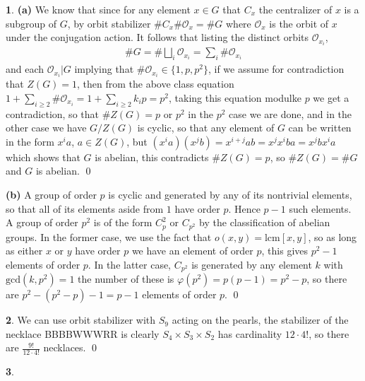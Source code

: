 \documentclass[10.5pt]{article}
\theoremstyle{definition}
\newtheorem{pb}{}
\newcommand{\set}[1]{\{#1\}}
\begin{document}
    \begin{pb}
        \textbf{(a)} We know that since for any element \(x \in G\) that \(C_x\) the centralizer of \(x\) is a subgroup of \(G\), by orbit stabilizer \(\#C_x\#\mathcal{O}_x = \#G\) where \(\mathcal{O}_x\) is the orbit of \(x\) under the conjugation action. It follows that listing the distinct orbits \(\mathcal{O}_{x_i}\),
        \begin{align*}
            \#G = \#\bigsqcup_i \mathcal{O}_{x_i} = \sum_i \#\mathcal{O}_{x_i}
        \end{align*}
        and each \(\mathcal{O}_{x_i} \vert G\) implying that \(\#\mathcal{O}_{x_i} \in \set{1,p,p^2}\), if we assume for contradiction that \(Z(G) = 1\), then from the above class equation \(1 + \sum_{i \geq 2} \#\mathcal{O}_{x_i} = 1 + \sum_{i \geq 2}k_i p = p^2\), taking this equation modulke \(p\) we get a contradiction, so that \(\#Z(G) = p\) or \(p^2\) in the \(p^2\) case we are done, and in the other case we have \(G/Z(G)\) is cyclic, so that any element of \(G\) can be written in the form \(x^ia\), \(a \in Z(G)\), but \((x^ia)(x^jb) = x^{i+j}ab = x^jx^iba = x^jbx^ia\) which shows that \(G\) is abelian, this contradicts \(\#Z(G) = p\), so \(\#Z(G) = \#G\) and \(G\) is abelian. \qed

        \textbf{(b)} A group of order \(p\) is cyclic and generated by any of its nontrivial elements, so that all of its elements aside from \(1\) have order \(p\). Hence \(p-1\) such elements. A group of order \(p^2\) is of the form \(C_p^2\) or \(C_{p^2}\) by the classification of abelian groups. In the former case, we use the fact that \(o(x,y) = \text{lcm}[x,y]\), so as long as either \(x\) or \(y\) have order \(p\) we have an element of order \(p\), this gives \(p^2 - 1\) elements of order \(p\). In the latter case, \(C_{p^2}\) is generated by any element \(k\) with \(\text{gcd}(k,p^2) = 1\) the number of these is \(\varphi(p^2) = p(p-1) = p^2 - p\), so there are \(p^2 - (p^2 - p) - 1 = p-1\) elements of order \(p\). \qed
    \end{pb}
    \begin{pb}
        We can use orbit stabilizer with \(S_9\) acting on the pearls, the stabilizer of the necklace BBBBWWWRR is clearly \(S_4 \times S_3 \times S_2\) has cardinality \(12\cdot4!\), so there are \(\frac{9!}{12\cdot4!}\) necklaces. \qed
    \end{pb}
    \begin{pb}
        
    \end{pb}
\end{document}
